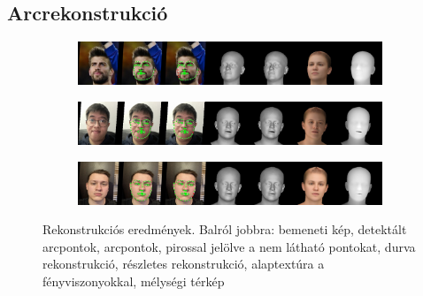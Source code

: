 \documentclass[12pt,a4]{article}
\begin{document}
        \subsection{Arcrekonstrukció}
            \begin{figure}[htb]
                \centering
                \begin{subfigure}[b]{1\textwidth}
                   \includegraphics[width=1\linewidth]{pique_vis.jpg}
                \end{subfigure}
                
                \begin{subfigure}[b]{1\textwidth}
                   \includegraphics[width=1\linewidth]{hua_vis.jpg}
                \end{subfigure}
                
                \begin{subfigure}[b]{1\textwidth}
                   \includegraphics[width=1\linewidth]{ruben_vis.jpg}
                \end{subfigure}
                
                \caption{Rekonstrukciós eredmények. Balról jobbra: bemeneti kép, detektált arcpontok, arcpontok, pirossal jelölve a nem látható pontokat, durva rekonstrukció, részletes rekonstrukció, alaptextúra a fényviszonyokkal, mélységi térkép}
            \end{figure}
\end{document}
